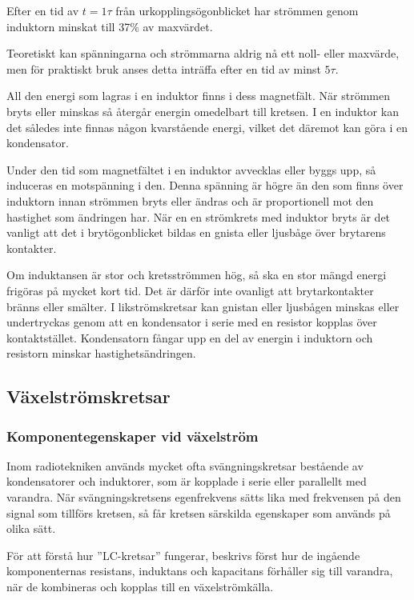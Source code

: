 Efter en tid av \(t = 1\tau\) från urkopplingsögonblicket har strömmen genom
induktorn minskat till 37\% av maxvärdet.

Teoretiskt kan spänningarna och strömmarna aldrig nå ett noll- eller maxvärde,
men för praktiskt bruk anses detta inträffa efter en tid av minst \(5\tau\).

All den energi som lagras i en induktor finns i dess magnetfält.
När strömmen bryts eller minskas så återgår energin omedelbart till kretsen.
I en induktor kan det således inte finnas någon kvarstående energi, vilket
det däremot kan göra i en kondensator.

Under den tid som magnetfältet i en induktor avvecklas eller byggs upp, så
induceras en motspänning i den.
Denna spänning är högre än den som finns över induktorn innan strömmen bryts
eller ändras och är proportionell mot den hastighet som ändringen har.
När en en strömkrets med induktor bryts är det vanligt att det i
brytögonblicket bildas en gnista eller ljusbåge över brytarens kontakter.

Om induktansen är stor och kretsströmmen hög, så ska en stor mängd energi
frigöras på mycket kort tid.
Det är därför inte ovanligt att brytarkontakter bränns eller smälter.
I likströmskretsar kan gnistan eller ljusbågen minskas eller undertryckas genom
att en kondensator i serie med en resistor kopplas över kontaktstället.
Kondensatorn fångar upp en del av energin i induktorn och resistorn minskar
hastighetsändringen.

\subsection{Växelströmskretsar}

\subsubsection{Komponentegenskaper vid växelström}

Inom radiotekniken används mycket ofta svängningskretsar bestående av
kondensatorer och induktorer, som är kopplade i serie eller parallellt med
varandra.
När svängningskretsens egenfrekvens sätts lika med frekvensen på den signal som
tillförs kretsen, så får kretsen särskilda egenskaper som används på olika sätt.

För att förstå hur ''LC-kretsar'' fungerar, beskrivs först hur de ingående
komponenternas resistans, induktans och kapacitans förhåller sig till varandra,
när de kombineras och kopplas till en växelströmkälla.


